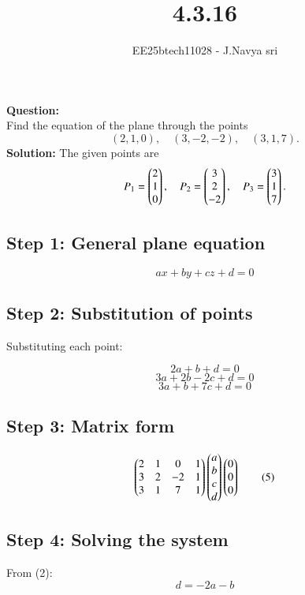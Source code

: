 \documentclass[journal]{IEEEtran}
\begin{document}

\vspace{3cm}

\title{4.3.16}
\author{EE25btech11028 - J.Navya sri}
{\let\newpage\relax\maketitle}


\textbf{Question:} \\
Find the equation of the plane through the points  
\[
(2,1,0), \quad (3,-2,-2), \quad (3,1,7).
\]
\textbf{Solution:}
The given points are
\[
P_1 = \begin{pmatrix}2\\1\\0\end{pmatrix}, \quad 
P_2 = \begin{pmatrix}3\\2\\-2\end{pmatrix}, \quad 
P_3 = \begin{pmatrix}3\\1\\7\end{pmatrix}.
\]
\subsection*{Step 1: General plane equation}
\[
ax + by + cz + d = 0 \tag{1}
\]
\subsection*{Step 2: Substitution of points}
Substituting each point:

\[
2a + b + d = 0 \tag{2}
\]
\[
3a + 2b - 2c + d = 0 \tag{3}
\]
\[
3a + b + 7c + d = 0 \tag{4}
\]
\subsection*{Step 3: Matrix form}
\[
\begin{pmatrix}
2 & 1 & 0 & 1\\
3 & 2 & -2 & 1\\
3 & 1 & 7 & 1
\end{pmatrix}
\begin{pmatrix}a\\ b\\ c\\ d\end{pmatrix}
\begin{pmatrix}0\\0\\0\end{pmatrix}
\tag{5}
\]
\subsection*{Step 4: Solving the system}
From (2):
\[
d = -2a - b \tag{6}
\]
\end{document}

